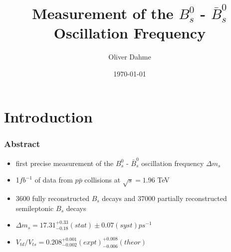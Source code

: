 \documentclass{beamer}
\title[B Oscillation]{Measurement of the $B^0_s$ - $\bar{B}^0_s$ Oscillation Frequency} %
\author{Oliver Dahme} %
\institute[UZH] %
{
University of Zurich \\ %
\medskip
\textit{o.dahme@cern.ch} %
}
\date{\today} %
\begin{document}
\begin{frame}
	\titlepage %
\end{frame}



\section{Introduction} %

\begin{frame}
	\frametitle{Abstract}
	\begin{itemize}
		\item first precise measurement of the $B^0_s$ - $\bar{B}^0_s$ oscillation frequency $\Delta m_s$
		\item 1$fb^{-1}$ of data from $p \bar{p}$ collisions at $\sqrt{s} = 1.96$ TeV
		\item 3600 fully reconstructed $B_s$ decays and 37000 partially reconstructed semileptonic $B_s$ decays
		\item $\Delta m_s = 17.31^{+0.33}_{-0.18} (stat) \pm 0.07 (syst) ps^{-1}$
		\item $V_{td} / V_{ts} = 0.208^{+0.001}_{-0.002}(expt) ^{+0.008}_{-0.006} (theor)$
	\end{itemize}
\end{frame}
\end{document}
